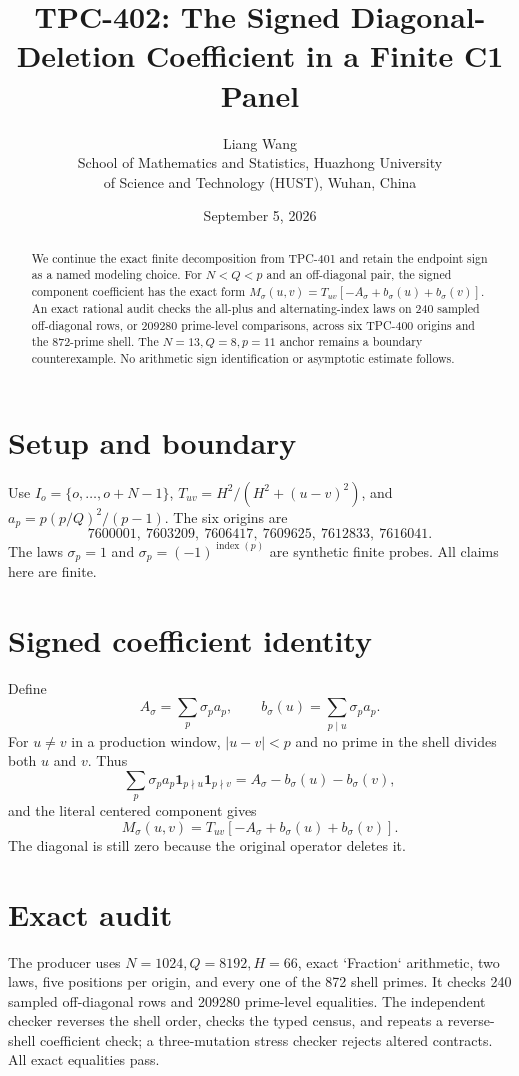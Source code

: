 \documentclass[11pt]{article}
\title{TPC-402: The Signed Diagonal-Deletion Coefficient in a Finite C1 Panel}
\author{Liang Wang\\School of Mathematics and Statistics, Huazhong University\\of Science and Technology (HUST), Wuhan, China}
\date{September 5, 2026}
\begin{document}
\maketitle
\begin{abstract}
We continue the exact finite decomposition from TPC-401 and retain the endpoint
sign as a named modeling choice.  For $N<Q<p$ and an off-diagonal pair, the
signed component coefficient has the exact form
$M_\sigma(u,v)=T_{uv}[-A_\sigma+b_\sigma(u)+b_\sigma(v)]$.
An exact rational audit checks the all-plus and alternating-index laws on 240
sampled off-diagonal rows, or 209280 prime-level comparisons, across six
TPC-400 origins and the 872-prime shell.  The $N=13,Q=8,p=11$ anchor remains a
boundary counterexample.  No arithmetic sign identification or asymptotic
estimate follows.
\end{abstract}
\section{Setup and boundary}
Use $I_o=\{o,\ldots,o+N-1\}$, $T_{uv}=H^2/(H^2+(u-v)^2)$, and
$a_p=p(p/Q)^2/(p-1)$.  The six origins are
\[
7600001,\ 7603209,\ 7606417,\ 7609625,\ 7612833,\ 7616041.
\]
The laws $\sigma_p=1$ and $\sigma_p=(-1)^{\operatorname{index}(p)}$ are
synthetic finite probes.  All claims here are finite.
\section{Signed coefficient identity}
Define
\[
A_\sigma=\sum_p\sigma_pa_p,\qquad
b_\sigma(u)=\sum_{p\mid u}\sigma_pa_p.
\]
For $u\ne v$ in a production window, $|u-v|<p$ and no prime in the shell
divides both $u$ and $v$.  Thus
\[
\sum_p\sigma_pa_p\mathbf1_{p\nmid u}\mathbf1_{p\nmid v}
=A_\sigma-b_\sigma(u)-b_\sigma(v),
\]
and the literal centered component gives
\[
\boxed{M_\sigma(u,v)=T_{uv}[-A_\sigma+b_\sigma(u)+b_\sigma(v)]}.
\]
The diagonal is still zero because the original operator deletes it.
\section{Exact audit}
The producer uses $N=1024,Q=8192,H=66$, exact `Fraction` arithmetic, two laws,
five positions per origin, and every one of the 872 shell primes.  It checks 240
sampled off-diagonal rows and 209280 prime-level equalities.  The independent
checker reverses the shell order, checks the typed census, and repeats a
reverse-shell coefficient check; a three-mutation stress checker rejects
altered contracts.  All exact equalities pass.
\end{document}
